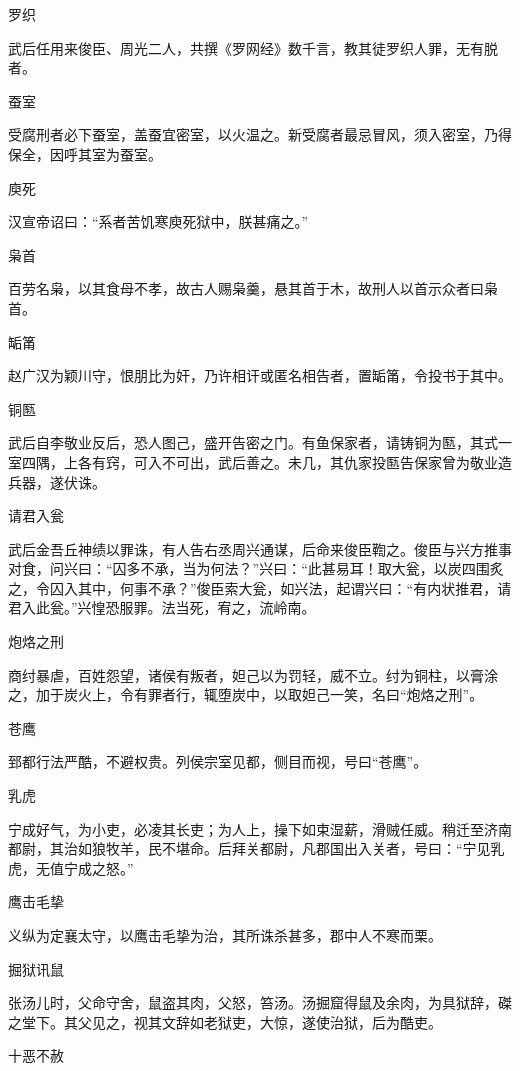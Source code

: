 \documentclass[a4paper,12pt,UTF8,twoside]{ctexbook}
\begin{document}
    罗织
    
    武后任用来俊臣、周光二人，共撰《罗网经》数千言，教其徒罗织人罪，无有脱者。
    
    蚕室
    
    受腐刑者必下蚕室，盖蚕宜密室，以火温之。新受腐者最忌冒风，须入密室，乃得保全，因呼其室为蚕室。
    
    庾死
    
    汉宣帝诏曰：“系者苦饥寒庾死狱中，朕甚痛之。”
    
    枭首
    
    百劳名枭，以其食母不孝，故古人赐枭羹，悬其首于木，故刑人以首示众者曰枭首。
    
    缿筩
    
    赵广汉为颖川守，恨朋比为奸，乃许相讦或匿名相告者，置缿筩，令投书于其中。
    
    铜匦
    
    武后自李敬业反后，恐人图己，盛开告密之门。有鱼保家者，请铸铜为匦，其式一室四隅，上各有窍，可入不可出，武后善之。未几，其仇家投匦告保家曾为敬业造兵器，遂伏诛。
    
    请君入瓮
    
    武后金吾丘神绩以罪诛，有人告右丞周兴通谋，后命来俊臣鞫之。俊臣与兴方推事对食，问兴曰：“囚多不承，当为何法？”兴曰：“此甚易耳！取大瓮，以炭四围炙之，令囚入其中，何事不承？”俊臣索大瓮，如兴法，起谓兴曰：“有内状推君，请君入此瓮。”兴惶恐服罪。法当死，宥之，流岭南。
    
    炮烙之刑
    
    商纣暴虐，百姓怨望，诸侯有叛者，妲己以为罚轻，威不立。纣为铜柱，以膏涂之，加于炭火上，令有罪者行，辄堕炭中，以取妲己一笑，名曰“炮烙之刑”。
    
    苍鹰
    
    郅都行法严酷，不避权贵。列侯宗室见都，侧目而视，号曰“苍鹰”。
    
    乳虎
    
    宁成好气，为小吏，必凌其长吏；为人上，操下如束湿薪，滑贼任威。稍迁至济南都尉，其治如狼牧羊，民不堪命。后拜关都尉，凡郡国出入关者，号曰：“宁见乳虎，无值宁成之怒。”
    
    鹰击毛挚
    
    义纵为定襄太守，以鹰击毛挚为治，其所诛杀甚多，郡中人不寒而栗。
    
    掘狱讯鼠
    
    张汤儿时，父命守舍，鼠盗其肉，父怒，笞汤。汤掘窟得鼠及余肉，为具狱辞，磔之堂下。其父见之，视其文辞如老狱吏，大惊，遂使治狱，后为酷吏。
    
    十恶不赦
    
\end{document}
